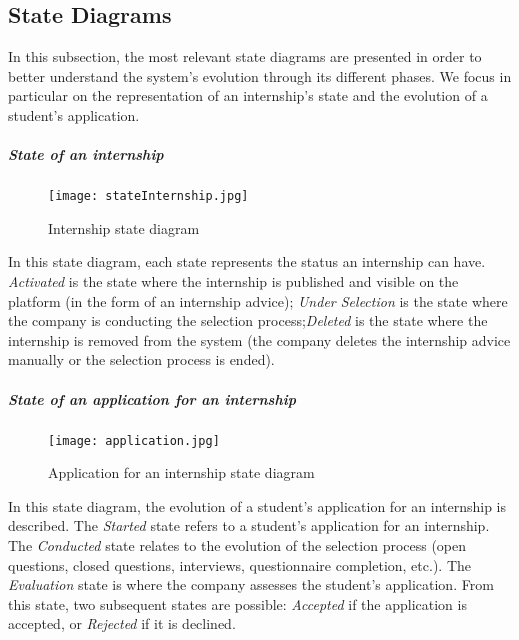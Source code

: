 			
			
			\subsection{State Diagrams}
				In this subsection, the most relevant state diagrams are presented in order to better understand the system's evolution through its different phases. We focus in particular on the representation of an internship's state and the evolution of a student's application.
				
				\subparagraph{State of an internship}
					\begin{figure}[H]
						\centering
						\texttt{[image: stateInternship.jpg]}
						\caption{Internship state diagram}
					\end{figure}
					
					In this state diagram, each state represents the status an internship can have. \textit{Activated} is the state where the internship is published and visible on the platform (in the form of an internship advice); \textit{Under Selection} is the state where the company is conducting the selection process;\textit{Deleted} is the state where the internship is removed from the system (the company deletes the internship advice manually or the selection process is ended).
					
				\subparagraph{State of an application for an internship}
					\begin{figure}[H]
						\centering
						\texttt{[image: application.jpg]}
						\caption{Application for an internship state diagram}
					\end{figure}
					
					In this state diagram, the evolution of a student's application for an internship is described. The \textit{Started} state refers to a student's application for an internship. The \textit{Conducted} state relates to the evolution of the selection process (open questions, closed questions, interviews, questionnaire completion, etc.). The \textit{Evaluation} state is where the company assesses the student's application. From this state, two subsequent states are possible: \textit{Accepted} if the application is accepted, or \textit{Rejected} if it is declined.
					
